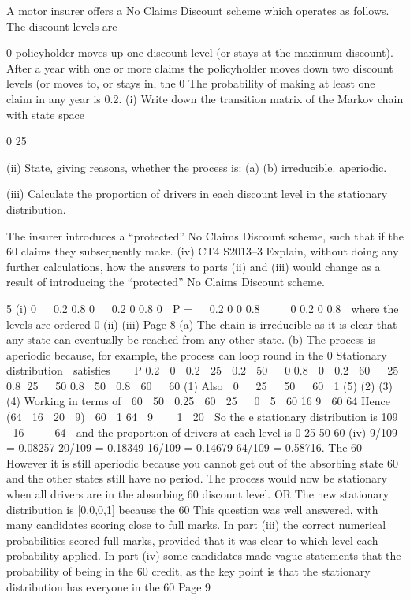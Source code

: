A motor insurer offers a No Claims Discount scheme which operates as follows. The
discount levels are {0%
policyholder moves up one discount level (or stays at the maximum discount). After
a year with one or more claims the policyholder moves down two discount levels (or
moves to, or stays in, the 0%
The probability of making at least one claim in any year is 0.2.
(i) Write down the transition matrix of the Markov chain with state space {0%
25%

(ii) State, giving reasons, whether the process is:
(a)
(b)
irreducible.
aperiodic.

(iii)
Calculate the proportion of drivers in each discount level in the stationary
distribution.

The insurer introduces a “protected” No Claims Discount scheme, such that if the
60%
claims they subsequently make.
(iv)
CT4 S2013–3
Explain, without doing any further calculations, how the answers to parts (ii)
and (iii) would change as a result of introducing the “protected” No Claims
Discount scheme.

5
(i)
0 
 0.2 0.8 0


0.2 0 0.8 0 
P = 
 0.2 0
0 0.8 


 0 0.2 0 0.8 
where the levels are ordered 0%
(ii)
(iii)
Page 8
(a) The chain is irreducible as it is clear that any state can eventually be reached
from any other state.
(b) The process is aperiodic because, for example, the process can loop round in
the 0%
Stationary distribution  satisfies    P
0.2  0  0.2  25  0.2  50   0
0.8  0  0.2  60   25
0.8 25   50
0.8  50  0.8  60   60 (1)
Also  0   25   50   60  1 (5)
(2)
(3)
(4)%
Working in terms of  60
 50  0.25  60
 25 
 0 
5
 60
16
9
 60
64
Hence
(64  16  20  9)
 60  1
64
 9 
 
1  20 
So the e stationary distribution is
109  16 
 
 64 
and the proportion of drivers at each level is
0%
25%
50%
60%
(iv)
9/109 = 0.08257
20/109 = 0.18349
16/109 = 0.14679
64/109 = 0.58716.
The 60%
However it is still aperiodic because you cannot get out of the absorbing state 60%
and the other states still have no period.
The process would now be stationary when all drivers are in the absorbing 60%
discount level.
OR
The new stationary distribution is [0,0,0,1] because the 60%
This question was well answered, with many candidates scoring close to full marks. In part
(iii) the correct numerical probabilities scored full marks, provided that it was clear to which
level each probability applied. In part (iv) some candidates made vague statements that the
probability of being in the 60%
credit, as the key point is that the stationary distribution has everyone in the 60%
Page 9%


}}
